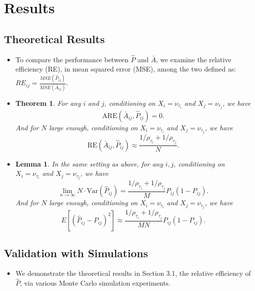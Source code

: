 \documentclass[a4paper]{article}
\newtheorem{lemma}[fact]{Lemma}
\newtheorem{theorem}[fact]{Theorem}
\begin{document}
\section{Results}

\subsection{Theoretical Results}
\begin{itemize}
\item To compare the performance between $\hat{P}$ and $\bar{A}$, we examine the relative efficiency (RE), in mean squared error (MSE), among the two defined as: $RE_{ij} = \frac{MSE(\hat{P}_{ij})}{MSE(\bar{A}_{ij})}$.
\item
\begin{theorem}
\label{thm:ARE}
For any $i$ and $j$, conditioning on $X_i = \nu_{\tau_i}$ and $X_j = \nu_{\tau_j}$, we have
\[
	\mathrm{ARE}(\bar{A}_{ij}, \hat{P}_{ij}) = 0.
\]
And for $N$ large enough, conditioning on $X_i = \nu_{\tau_i}$ and $X_j = \nu_{\tau_j}$, we have
\[
	\mathrm{RE}(\bar{A}_{ij}, \hat{P}_{ij}) \approx
    \frac{1/\rho_{\tau_i} + 1/\rho_{\tau_j}}{N}.
\]
\end{theorem}
\item
\begin{lemma}
\label{lm:VarPhat}
In the same setting as above, for any $i, j$, conditioning on $X_i = \nu_{\tau_i}$ and $X_j = \nu_{\tau_j}$, we have
\[
	\lim_{n \to \infty} N \cdot \mathrm{Var}(\hat{P}_{ij}) =
    \frac{1/\rho_{\tau_i} + 1/\rho_{\tau_j}}{M} P_{ij} (1 - P_{ij}).
\]
And for $N$ large enough, conditioning on $X_i = \nu_{\tau_i}$ and $X_j = \nu_{\tau_j}$, we have
\[
	E[(\hat{P}_{ij} - P_{ij})^2] \approx
    \frac{1/\rho_{\tau_i} + 1/\rho_{\tau_j}}{M N} P_{ij}(1-P_{ij}).
\]
\end{lemma}
\end{itemize}

\subsection{Validation with Simulations}
\begin{itemize}
\item We demonstrate the theoretical results in Section 3.1, the relative efficiency of $\hat{P}$, via various Monte Carlo simulation experiments.
\end{itemize}
\end{document}
